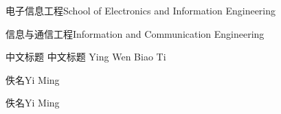 
\school
{电子信息工程}{School of Electronics and Information Engineering}

\major
{信息与通信工程}{Information and Communication Engineering}

\thesistitle
{中文标题}
{中文标题} %
{} %
{Ying Wen Biao Ti}
{} %

\thesisauthor
{佚名}{Yi Ming}

\teacher
{佚名}{Yi Ming}







